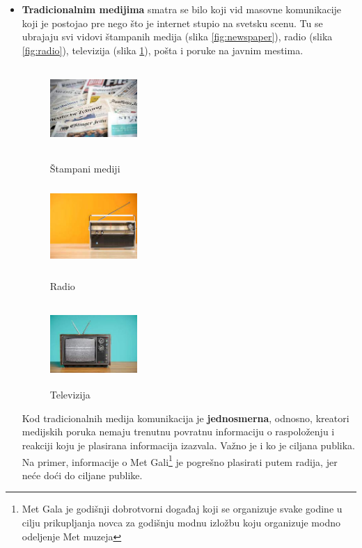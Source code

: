 \documentclass[a4paper]{article}
\begin{document}
\begin{itemize}
	\item \textbf{Tradicionalnim medijima} smatra se bilo koji vid masovne komunikacije koji je postojao pre nego što je internet stupio na svetsku scenu. Tu se ubrajaju svi vidovi štampanih medija (slika \ref{fig:newspaper}), radio (slika \ref{fig:radio}), televizija (slika \ref{fig:tv}), pošta i poruke na javnim mestima.

\begin{figure}[h]
\begin{center}
\begin{subcaptiongroup}
\includegraphics[width=1.3in,height=1.225in]{slika 1.jpg}
\caption{Štampani mediji}
\label{fig:newspaper}
\end{subcaptiongroup}
\begin{subcaptiongroup}
	\includegraphics[width=1.3in,height=1.225in]{slika 2.jpg}
 \caption{Radio}
 \label{fig:radio}
\end{subcaptiongroup}
\begin{subcaptiongroup}
	\includegraphics[width=1.3in,height=1.225in]{slika 3.jpg}
 \caption{Televizija}
 \label{fig:tv}
\end{subcaptiongroup}
\end{center}
 \end{figure}

Kod tradicionalnih medija komunikacija je \textbf{jednosmerna}, odnosno, kreatori medijskih poruka nemaju trenutnu povratnu informaciju o raspoloženju i reakciji koju je plasirana informacija izazvala. Važno je i ko je ciljana publika. Na primer, informacije o Met Gali\footnote{Met Gala je godišnji dobrotvorni događaj koji se organizuje svake godine u cilju prikupljanja novca za godišnju modnu izložbu koju organizuje modno odeljenje Met muzeja } je pogrešno plasirati putem radija, jer neće doći do ciljane publike.


\end{itemize}
\end{document}
